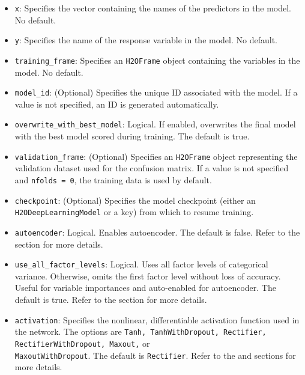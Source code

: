 {{{\begin{itemize}

\item \texttt{x}: Specifies the vector containing the names of the predictors in the model. No default.

\item \texttt{y}: Specifies the name of the response variable in the model. No default.

\item \texttt{training\_frame}: Specifies an \texttt{H2OFrame} object containing the variables in the model.  No default.

\item \texttt{model\_id}: (Optional) Specifies the unique ID associated with the model. If a value is not specified, an ID is generated automatically. 

\item \texttt{overwrite\_with\_best\_model}: Logical. If enabled, overwrites the final model with the best model scored during training. The default is true.

\item \texttt{validation\_frame}: (Optional) Specifies an \texttt{H2OFrame} object representing the validation dataset used for the confusion matrix. If a value is not specified and \texttt{nfolds = 0}, the training data is used by default. 

\item \texttt{checkpoint}: (Optional) Specifies the model checkpoint (either an \\ \texttt{H2ODeepLearningModel} or a key) from which to resume training. 

\item \texttt{autoencoder}: Logical. Enables autoencoder. The default is false. Refer to the {\textbf{}} section for more details.

\item \texttt{use\_all\_factor\_levels}: Logical. Uses all factor levels of categorical variance. Otherwise, omits the first factor level without loss of accuracy. Useful for variable importances and auto-enabled for autoencoder.  The default is true. Refer to the {\textbf{}} section for more details.

\item \texttt{activation}: Specifies the nonlinear, differentiable activation function used in the network. The options are \texttt{Tanh, TanhWithDropout, Rectifier, RectifierWithDropout, Maxout,} or \\\texttt{MaxoutWithDropout}. The default is \texttt{Rectifier}. Refer to the {\textbf{}} and {\textbf{}} sections for more details.


\end{itemize}}}}
